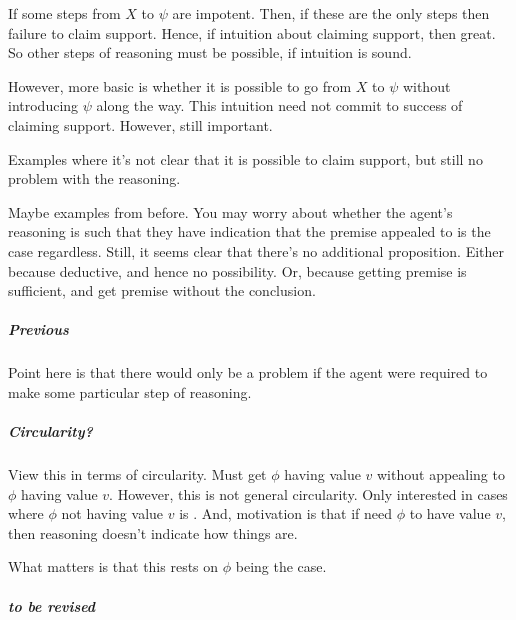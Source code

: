 \begin{note}
  If some steps from \(X\) to \(\psi\) are impotent.
  Then, if these are the only steps then failure to claim support.
  Hence, if intuition about claiming support, then great.
  So other steps of reasoning must be possible, if intuition is sound.

  However, more basic is whether it is possible to go from \(X\) to \(\psi\) without introducing \(\psi\) along the way.
  This intuition need not commit to success of claiming support.
  However, still important.

  Examples where it's not clear that it is possible to claim support, but still no problem with the reasoning.

  Maybe examples from before.
  You may worry about whether the agent's reasoning is such that they have indication that the premise appealed to is the case regardless.
  Still, it seems clear that there's no additional proposition.
  Either because deductive, and hence no possibility.
  Or, because getting premise is sufficient, and get premise without the conclusion.
\end{note}

\subparagraph{Previous }

\begin{note}
  Point here is that there would only be a problem if the agent were required to make some particular step of reasoning.
\end{note}

\subparagraph{Circularity?}

\begin{note}[Circularity?]
  View this in terms of circularity.
  Must get \(\phi\) having value \(v\) without appealing to \(\phi\) having value \(v\).
  However, this is not general circularity.
  Only interested in cases where \(\phi\) not having value \(v\) is \epVAd{}.
  And, motivation is that if need \(\phi\) to have value \(v\), then reasoning doesn't indicate how things are.

  What matters is that this rests on \(\phi\) being the case.
\end{note}

\subparagraph{ to be revised}

